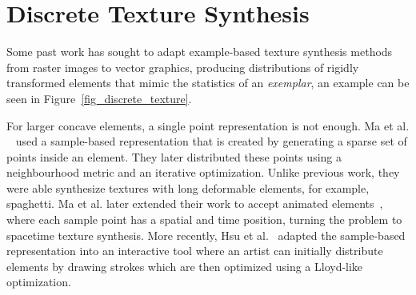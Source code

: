 \section{Discrete Texture Synthesis}



\newtext
{
Some past work has sought to adapt example-based texture synthesis methods
from raster images to vector graphics, producing distributions of
rigidly transformed elements that mimic the statistics of an \textit{exemplar}, 
an example can be seen in Figure~\ref{fig_discrete_texture}.}

\newtext
{
For larger concave elements, a single point representation is not enough.
Ma et al. ~\cite{Ma2011} used a sample-based representation that
is created by generating a sparse set of points inside an element.
They later distributed these points using a neighbourhood metric and an iterative optimization.
Unlike previous work, they were able synthesize textures with long deformable elements, for example, spaghetti.
Ma et al. later extended their work to accept animated elements~\cite{Ma2013}, where
each sample point has a spatial and time position, turning the problem to spacetime texture synthesis.
More recently, Hsu et al.~\cite{Hsu2020} adapted the sample-based representation into an interactive tool
where an artist can initially distribute elements by drawing strokes
which are then optimized using a Lloyd-like optimization.
}


